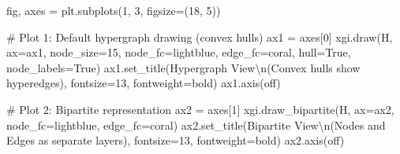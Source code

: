 \documentclass[
  11pt,
  letterpaper,
  oneside,
  openany]{book}
\newenvironment{Shaded}{\begin{snugshade}}{\end{snugshade}}
\newcommand{\CharTok}[1]{\textcolor[rgb]{0.13,0.47,0.30}{#1}}
\newcommand{\CommentTok}[1]{\textcolor[rgb]{0.37,0.37,0.37}{#1}}
\newcommand{\DecValTok}[1]{\textcolor[rgb]{0.68,0.00,0.00}{#1}}
\newcommand{\NormalTok}[1]{\textcolor[rgb]{0.00,0.23,0.31}{#1}}
\newcommand{\OperatorTok}[1]{\textcolor[rgb]{0.37,0.37,0.37}{#1}}
\newcommand{\StringTok}[1]{\textcolor[rgb]{0.13,0.47,0.30}{#1}}
\newcommand{\VariableTok}[1]{\textcolor[rgb]{0.07,0.07,0.07}{#1}}
\begin{document}
\begin{Shaded}
\begin{Highlighting}[]
\NormalTok{fig, axes }\OperatorTok{=}\NormalTok{ plt.subplots(}\DecValTok{1}\NormalTok{, }\DecValTok{3}\NormalTok{, figsize}\OperatorTok{=}\NormalTok{(}\DecValTok{18}\NormalTok{, }\DecValTok{5}\NormalTok{))}

\CommentTok{\# Plot 1: Default hypergraph drawing (convex hulls)}
\NormalTok{ax1 }\OperatorTok{=}\NormalTok{ axes[}\DecValTok{0}\NormalTok{]}
\NormalTok{xgi.draw(H, ax}\OperatorTok{=}\NormalTok{ax1, node\_size}\OperatorTok{=}\DecValTok{15}\NormalTok{, node\_fc}\OperatorTok{=}\StringTok{\textquotesingle{}lightblue\textquotesingle{}}\NormalTok{, }
\NormalTok{         edge\_fc}\OperatorTok{=}\StringTok{\textquotesingle{}coral\textquotesingle{}}\NormalTok{, hull}\OperatorTok{=}\VariableTok{True}\NormalTok{, node\_labels}\OperatorTok{=}\VariableTok{True}\NormalTok{)}
\NormalTok{ax1.set\_title(}\StringTok{\textquotesingle{}Hypergraph View}\CharTok{\textbackslash{}n}\StringTok{(Convex hulls show hyperedges)\textquotesingle{}}\NormalTok{, }
\NormalTok{              fontsize}\OperatorTok{=}\DecValTok{13}\NormalTok{, fontweight}\OperatorTok{=}\StringTok{\textquotesingle{}bold\textquotesingle{}}\NormalTok{)}
\NormalTok{ax1.axis(}\StringTok{\textquotesingle{}off\textquotesingle{}}\NormalTok{)}

\CommentTok{\# Plot 2: Bipartite representation}
\NormalTok{ax2 }\OperatorTok{=}\NormalTok{ axes[}\DecValTok{1}\NormalTok{]}
\NormalTok{xgi.draw\_bipartite(H, ax}\OperatorTok{=}\NormalTok{ax2, node\_fc}\OperatorTok{=}\StringTok{\textquotesingle{}lightblue\textquotesingle{}}\NormalTok{, edge\_fc}\OperatorTok{=}\StringTok{\textquotesingle{}coral\textquotesingle{}}\NormalTok{)}
\NormalTok{ax2.set\_title(}\StringTok{\textquotesingle{}Bipartite View}\CharTok{\textbackslash{}n}\StringTok{(Nodes and Edges as separate layers)\textquotesingle{}}\NormalTok{, }
\NormalTok{              fontsize}\OperatorTok{=}\DecValTok{13}\NormalTok{, fontweight}\OperatorTok{=}\StringTok{\textquotesingle{}bold\textquotesingle{}}\NormalTok{)}
\NormalTok{ax2.axis(}\StringTok{\textquotesingle{}off\textquotesingle{}}\NormalTok{)}


\end{Highlighting}
\end{Shaded}
\end{document}
